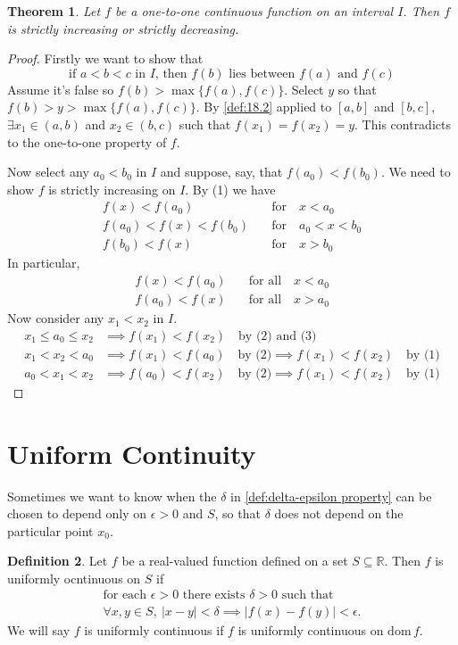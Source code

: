 \documentclass[12pt, lettersize]{book}
\theoremstyle{plain}
\newtheorem{thm}{Theorem}[section]
\theoremstyle{definition}
\newtheorem{dfn}[thm]{Definition}
\theoremstyle{remark}
\newcommand{\R}{\mathbb{R}}
\newcommand{\dom}{\text{dom}\,}
\begin{document}
			\setcounter{equation}{0}
			\begin{thm}
			Let $f$ be a \emph{one-to-one} continuous function on an interval $I$. Then $f$ is strictly increasing or strictly decreasing.
			\end{thm}
			\begin{proof}
			Firstly we want to show that
			\begin{equation}
				\text{if $a<b<c$ in $I$, then $f(b)$ lies between $f(a)$ and $f(c)$}
			\end{equation}
			Assume it's false so $f(b)>\max\{f(a),f(c)\}$. Select $y$ so that $f(b)>y>\max\{f(a),f(c)\}$. By \ref{def:18.2} applied to $[a,b]$ and $[b,c]$, $\exists x_1\in(a,b)$ and $x_2\in(b,c)$ such that $f(x_1)=f(x_2)=y$. This contradicts to the one-to-one property of $f$. 
			
			Now select any $a_0<b_0$ in $I$ and suppose, say, that $f(a_0)<f(b_0)$. We need to show $f$ is strictly increasing on $I$. By (1) we have
			\begin{align*}
				f(x)<f(a_0)\quad&\text{for}\quad x<a_0\\
				f(a_0)<f(x)<f(b_0)\quad&\text{for}\quad a_0<x<b_0\\
				f(b_0)<f(x)\quad&\text{for}\quad x>b_0
			\end{align*}
			In particular,
			\begin{align}
				f(x)<f(a_0)\quad&\text{for all}\quad x<a_0\\
				f(a_0)<f(x)\quad&\text{for all}\quad x>a_0
			\end{align}
			Now consider any $x_1<x_2$ in $I$.
			\begin{align*}
				x_1\leq a_0\leq x_2 &\implies f(x_1)<f(x_2)\quad\text{by (2) and (3)}\\
				x_1<x_2<a_0&\implies f(x_1)<f(a_0)\quad\text{by (2)} \implies f(x_1)<f(x_2)\quad\text{by (1)}\\
				a_0<x_1<x_2&\implies f(a_0)<f(x_2)\quad\text{by (2)} \implies f(x_1)<f(x_2)\quad\text{by (1)}
			\end{align*}
			\end{proof}
			\newpage
		\section{Uniform Continuity}
			Sometimes we want to know when the $\delta$ in \ref{def:delta-epsilon property} can be chosen to depend only on
			$\epsilon>0$ and $S$, so that $\delta$ does not depend on the particular point $x_0$.
			\begin{dfn}
			Let $f$ be a real-valued function defined on a set $S\subseteq\R$. Then $f$ is uniformly ocntinuous on $S$ if
			\begin{align*}
				\text{for each $\epsilon>0$ there exists $\delta>0$ such that}\\
				\text{$\forall x,y\in S,\ |x-y|<\delta\implies|f(x)-f(y)|<\epsilon.$}
			\end{align*}
			We will say $f$ is uniformly continuous if $f$ is uniformly continuous on $\dom f$.
			\end{dfn}
			
\end{document}
